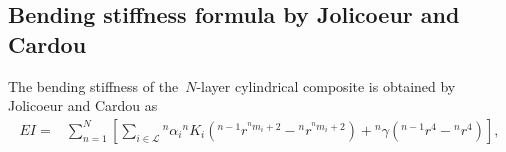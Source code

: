 \documentclass[preprint,10pt,times]{elsarticle}
\numberwithin{equation}{section}
\renewcommand{\>}{$\Rightarrow$}
\begin{document}
\subsection{Bending stiffness formula by Jolicoeur and Cardou}
\label{sec:bending stiffness}
The bending stiffness of the~$N$-layer cylindrical composite is obtained by Jolicoeur and Cardou as
\begin{equation}
	\begin{aligned}
	EI = & \sum_{n=1}^{N} \left[ \sum_{i \in \mathcal{L}} {}^{n}\!{\alpha_{i}} {}^{n}\!{K_{i}}  ({}^{n-1}\!{r}^{{}^{n}\!{m_{i}}+2} - {}^{n}\!{r}^{{}^{n}\!{m_{i}}+2}) + {}^{n}\!\gamma({}^{n-1}\!{r}^4 - {}^{n}\!{r}^4) \right],
	\end{aligned}
	\label{eq:EI}
\end{equation}
\end{document}
